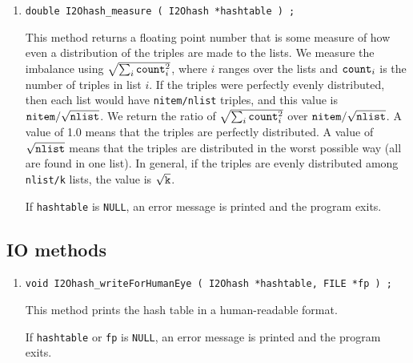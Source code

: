 \begin{enumerate}
\item
\begin{verbatim}
double I2Ohash_measure ( I2Ohash *hashtable ) ;
\end{verbatim}
This method returns a floating point number that is some measure of
how even a distribution of the {\tt <key1,key2,value>} triples 
are made to the lists.
We measure the imbalance using 
$\sqrt{\sum_{i} \mbox{\tt count}_i^2}$,
where $i$ ranges over the lists and $\mbox{\tt count}_i$ is the number
of triples in list $i$.
If the triples were perfectly evenly distributed, then each list would
have {\tt nitem/nlist} triples, and this value is
$\mbox{\tt nitem}/\sqrt{\mbox{\tt nlist}}$.
We return the ratio of 
$\sqrt{\sum_{i} \mbox{\tt count}_i^2}$ over
$\mbox{\tt nitem}/\sqrt{\mbox{\tt nlist}}$.
A value of 1.0 means that the triples are perfectly distributed.
A value of $\sqrt{\mbox{\tt nlist}}$ means that the triples are 
distributed in the worst possible way (all are found in one list).
In general, if the triples are evenly distributed among {\tt nlist/k}
lists, the value is $\sqrt{\mbox{\tt k}}$.
\par {}
If {\tt hashtable} is {\tt NULL},
an error message is printed and the program exits.
\end{enumerate}
\par
\subsection{IO methods}
\label{subsection:I2Ohash:proto:IO}
\par
\begin{enumerate}
\item
\begin{verbatim}
void I2Ohash_writeForHumanEye ( I2Ohash *hashtable, FILE *fp ) ;
\end{verbatim}
This method prints the hash table in a human-readable format.
\par {}
If {\tt hashtable} or {\tt fp} is {\tt NULL},
an error message is printed and the program exits.
\end{enumerate}
